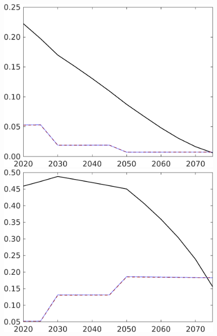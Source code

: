 \begin{figure}[h!!]
\begin{minipage}[]{0.32\textwidth}
	\end{minipage}
	\begin{minipage}[]{0.32\textwidth}
		\includegraphics[width=1\textwidth]{../../codding_model/own_basedOnFried/optimalPol_190722_tidiedUp/figures/all_July22/sff_DDCompEffOPT_T_NoTaus_pol4_spillover0_noskill1_sep1_xgrowth0_etaa0.79_lgd0_lff0.png}
	\end{minipage}
	\begin{minipage}[]{0.32\textwidth}
		\includegraphics[width=1\textwidth]{../../codding_model/own_basedOnFried/optimalPol_190722_tidiedUp/figures/all_July22/sg_DDCompEffOPT_T_NoTaus_pol4_spillover0_noskill1_sep1_xgrowth0_etaa0.79_lgd0_lff0.png}

\end{minipage}
\end{figure}
